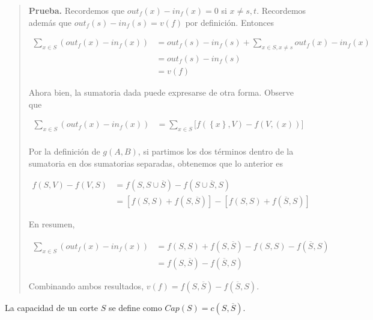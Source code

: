 \documentclass[a4paper, 12pt]{article}
\begin{document}
\small
\begin{quote}

\textbf{Prueba.} Recordemos que $out_f (x) - in_f(x) = 0$ si $x \neq s, t$.
Recordemos además que $out_f(s) - in_f(s) = v(f)$ por definición. Entonces 

\begin{align*}
    \sum_{x \in S} \left( out_f(x) - in_f(x) \right) &= out_f(s) - in_f(s) +
    \sum_{x \in S, x \neq s} out_f(x) - in_f(x)  \\ 
                                                     &= out_f(s) - in_f(s) \\ 
                                                     &= v(f)
\end{align*}

Ahora bien, la sumatoria dada puede expresarse de otra forma. Observe que 

\begin{align*}
    \sum_{x \in S} \left( out_f(x) - in_f(x) \right)  &= \sum_{x \in S} \Big[f\left(
    \left\{ x \right\}, V \right) - f(V, \left( x \right) )\Big] \\ 
\end{align*}

Por la definición de $g(A, B)$, si partimos los dos términos dentro de la
sumatoria en dos sumatorias separadas, obtenemos que lo anterior es

\begin{align*}
    f(S, V) - f(V, S) &= f(S, S \cup \overline{S}) - f(S \cup \overline{S}, S)
    \\ 
                      &=\left[ f(S, S) + f(S, \overline{S}) \right]  - \left[
                      f(S, S) + f(\overline{S}, S) \right] 
\end{align*}

En resumen, 

\begin{align*}
    \sum_{x \in S}\left( out_f(x) - in_f(x) \right)  &= f(S, S) + f(S,
    \overline{S}) - f(S, S) - f(\overline{S}, S) \\ 
                                                     &= f(S, \overline{S}) -
                                                     f(\overline{S}, S)
\end{align*}

Combinando ambos resultados, $v(f) = f(S, \overline{S}) - f(\overline{S}, S)$.

\end{quote}
\normalsize

\begin{definition}
    La capacidad de un corte $S$ se define como $Cap(S) = c(S, \overline{S})$.
\end{definition}
\end{document}
